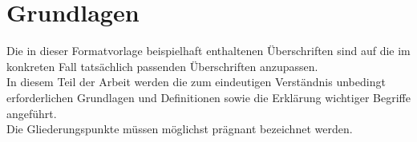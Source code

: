 

\chapter{Grundlagen} \label{cha:fundaments}
Die in dieser Formatvorlage beispielhaft enthaltenen Überschriften sind auf die im konkreten Fall tatsächlich passenden Überschriften anzupassen.\\
In diesem Teil der Arbeit werden die zum eindeutigen Verständnis unbedingt erforderlichen 
Grundlagen und Definitionen sowie die Erklärung wichtiger Begriffe angeführt.\\
Die Gliederungspunkte müssen möglichst prägnant bezeichnet werden.






